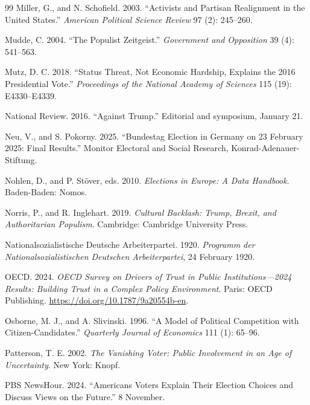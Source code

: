 \documentclass[12pt,letterpaper]{article}
\begin{document}
\begin{thebibliography}{99}
Miller, G., and N. Schofield. 2003. ``Activists and Partisan Realignment in the United States.'' \textit{American Political Science Review} 97 (2): 245--260.

Mudde, C. 2004. ``The Populist Zeitgeist.'' \textit{Government and Opposition} 39 (4): 541--563.

Mutz, D. C. 2018. ``Status Threat, Not Economic Hardship, Explains the 2016 Presidential Vote.'' \textit{Proceedings of the National Academy of Sciences} 115 (19): E4330--E4339.

National Review. 2016. ``Against Trump.'' Editorial and symposium, January 21.

Neu, V., and S. Pokorny. 2025. ``Bundestag Election in Germany on 23 February 2025: Final Results.'' Monitor Electoral and Social Research, Konrad-Adenauer-Stiftung.

Nohlen, D., and P. St\"{o}ver, eds. 2010. \textit{Elections in Europe: A Data Handbook}. Baden-Baden: Nomos.

Norris, P., and R. Inglehart. 2019. \textit{Cultural Backlash: Trump, Brexit, and Authoritarian Populism}. Cambridge: Cambridge University Press.

Nationalsozialistische Deutsche Arbeiterpartei. 1920. \textit{Programm der Nationalsozialistischen Deutschen Arbeiterpartei}, 24 February 1920.

OECD. 2024. \textit{OECD Survey on Drivers of Trust in Public Institutions---2024 Results: Building Trust in a Complex Policy Environment}. Paris: OECD Publishing. \url{https://doi.org/10.1787/9a20554b-en}.

Osborne, M. J., and A. Slivinski. 1996. ``A Model of Political Competition with Citizen-Candidates.'' \textit{Quarterly Journal of Economics} 111 (1): 65--96.

Patterson, T. E. 2002. \textit{The Vanishing Voter: Public Involvement in an Age of Uncertainty}. New York: Knopf.

PBS NewsHour. 2024. ``Americans Voters Explain Their Election Choices and Discuss Views on the Future.'' 8 November.


\end{thebibliography}
\end{document}
